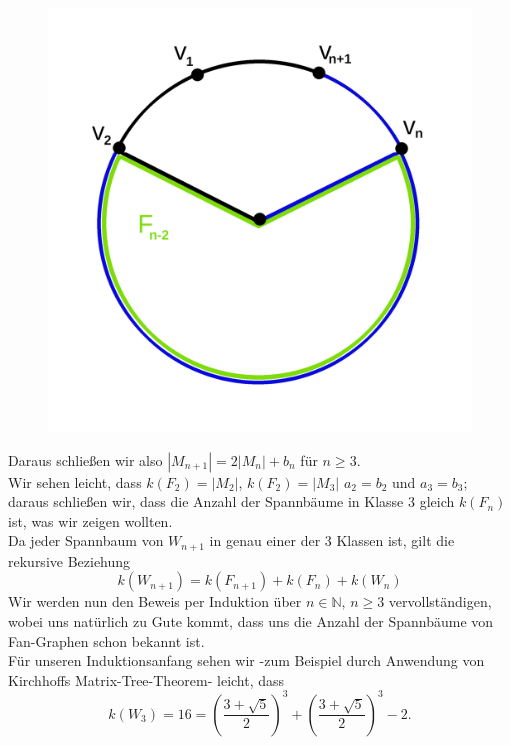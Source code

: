 \begin{figure}[H]
\begin{minipage}{0.45\textwidth}
        \includegraphics[width=1\textwidth]{mn3.png}
        \caption{}
 \label{mn3} %
    \end{minipage}
\end{figure}
Daraus schließen wir also $|M_{n+1}|=2|M_n|+b_n$ für $n\geq3$.\\
Wir sehen leicht, dass $\mathit{k}\left(F_2\right) = |M_2|$, $\mathit{k}\left(F_2\right)=|M_3|$ $a_2=b_2$ und $a_3=b_3$; daraus schließen wir, dass die Anzahl der Spannbäume in Klasse 3 gleich $\mathit{k}\left(F_{n}\right)$ ist, was wir zeigen wollten.\\
Da jeder Spannbaum von $W_{n+1}$ in genau einer der 3 Klassen ist, gilt die rekursive Beziehung
\begin{equation}
\mathit{k}\left(W_{n+1}\right) = \mathit{k}\left(F_{n+1}\right) + \mathit{k}\left(F_n\right) + \mathit{k}\left(W_n\right)
\label{eq:wrek}
\end{equation}
Wir werden nun den Beweis per Induktion über $n \in \mathbb{N}, \, n \geq 3$ vervollständigen, wobei uns natürlich zu Gute kommt, dass uns die Anzahl der Spannbäume von Fan-Graphen schon bekannt ist.\\
Für unseren Induktionsanfang sehen wir -zum Beispiel durch Anwendung von Kirchhoffs Matrix-Tree-Theorem- leicht, dass \begin{equation}
\mathit{k}\left(W_3\right) = 16 = \left(\frac{3+\sqrt{5}}{2}\right)^3+\left(\frac{3+\sqrt{5}}{2}\right)^3-2.
\end{equation}
